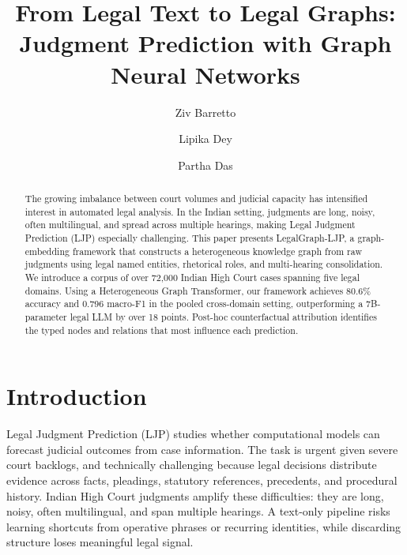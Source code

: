 \documentclass[runningheads]{llncs}
\newcommand{\method}{LegalGraph-LJP}
\begin{document}
\title{From Legal Text to Legal Graphs: Judgment Prediction with Graph Neural Networks}

\author{Ziv Barretto\and Lipika Dey\Envelope\and Partha Das}


\maketitle

\begin{abstract}
The growing imbalance between court volumes and judicial capacity has intensified interest in automated legal analysis. In the Indian setting, judgments are long, noisy, often multilingual, and spread across multiple hearings, making Legal Judgment Prediction (LJP) especially challenging. This paper presents \method{}, a graph-embedding framework that constructs a heterogeneous knowledge graph from raw judgments using legal named entities, rhetorical roles, and multi-hearing consolidation. We introduce a corpus of over 72,000 Indian High Court cases spanning five legal domains. Using a Heterogeneous Graph Transformer, our framework achieves 80.6\% accuracy and 0.796 macro-F1 in the pooled cross-domain setting, outperforming a 7B-parameter legal LLM by over 18 points. Post-hoc counterfactual attribution identifies the typed nodes and relations
that most influence each prediction.
\end{abstract}

\section{Introduction}
\label{sec:introduction}

Legal Judgment Prediction (LJP) studies whether computational models can forecast judicial outcomes from case information. The task is urgent given severe court backlogs, and technically challenging because legal decisions distribute evidence across facts, pleadings, statutory references, precedents, and procedural history. Indian High Court judgments amplify these difficulties: they are long, noisy, often multilingual, and span multiple hearings. A text-only pipeline risks learning shortcuts from operative phrases or recurring identities, while discarding structure loses meaningful legal signal.
\end{document}
